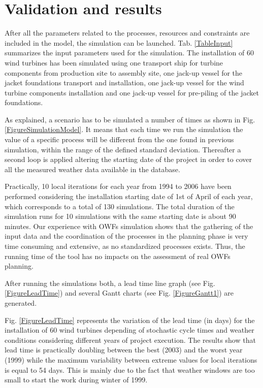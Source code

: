 \section{Validation and results}
After all the parameters related to the processes, resources and constraints are included in the model, the simulation can be launched. Tab. \ref{TableInput} summarizes the input parameters used for the simulation. The installation of 60 wind turbines has been simulated  using one transport ship for turbine components from production site to assembly site, one jack-up vessel for the jacket foundations transport and installation, one jack-up vessel for the wind turbine components installation and one jack-up vessel for pre-piling of the jacket foundations.

As explained, a scenario has to be simulated a number of times as shown in Fig. \ref{FigureSimulationModel}. It means that each time we run the simulation the value of a specific process will be different from the one found in previous simulation, within the range of the defined standard deviation. Thereafter a second loop is applied altering the starting date of the project in order to cover all the measured weather data available in the database.

Practically, 10 local iterations for each year from 1994 to 2006 have been performed considering the installation starting date of 1st of April of each year, which corresponds to a total of 130 simulations. The total duration of the simulation runs for 10 simulations with the same starting date is about 90 minutes. Our experience with OWFs simulation shows that the gathering of the input data and the coordination of the processes in the planning phase is very time consuming and extensive, as no standardized processes exists. Thus, the running time of the tool has no impacts on the assessment of real OWFs planning.

After running the simulations both, a lead time line graph (see Fig. \ref{FigureLeadTime}) and several Gantt charts (see Fig. \ref{FigureGantt1}) are generated.

Fig. \ref{FigureLeadTime} represents the variation of the lead time (in days) for the installation of 60 wind turbines depending of stochastic cycle times and weather conditions considering different years of project execution. The results show that lead time is practically doubling between the best (2003) and the worst year (1999) while the maximum variability between extreme values for local iterations is equal to 54 days. This is mainly due to the fact that weather windows are too small to start the work during winter of 1999.   



